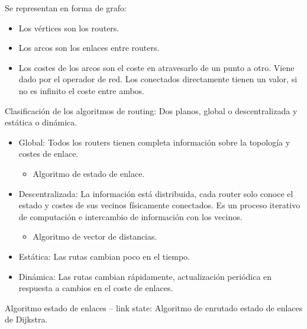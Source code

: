 \documentclass[12pt, twoside, openright]{report} %
\begin{document}
Se representan en forma de grafo:

\begin{itemize}
	\item Los vértices son los routers.
	\item Los arcos son los enlaces entre routers.
	\item Los costes de los arcos son el coste en atravesarlo de un punto a
	      otro. Viene dado por el operador de red. Los conectados
	      directamente tienen un valor, si no es infinito el coste entre
	      ambos.
\end{itemize}

Clasificación de los algoritmos de routing: Dos planos, global o
descentralizada y estática o dinámica.

\begin{itemize}
	\item Global: Todos los routers tienen completa información sobre la
	      topología y costes de enlace.

	      \begin{itemize}
		      \item Algoritmo de estado de enlace.
	      \end{itemize}
	\item Descentralizada: La información está distribuida, cada router solo
	      conoce el estado y costes de sus vecinos físicamente conectados.
	      Es un proceso iterativo de computación e intercambio de
	      información con los vecinos.

	      \begin{itemize}
		      \item Algoritmo de vector de distancias.
	      \end{itemize}
	\item Estática: Las rutas cambian poco en el tiempo.
	\item Dinámica: Las rutas cambian rápidamente, actualización periódica
	      en respuesta a cambios en el coste de enlaces.
\end{itemize}

Algoritmo estado de enlaces -- link state: Algoritmo de enrutado
estado de enlaces de Dijkstra.
\end{document}
